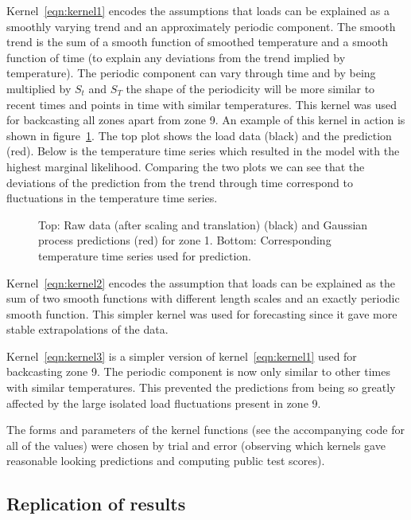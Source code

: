 \documentclass[preprint,authoryear,12pt]{elsarticle}
\begin{document}
Kernel~\eqref{eqn:kernel1} encodes the assumptions that loads can be explained as a smoothly varying trend and an approximately periodic component.
The smooth trend is the sum of a smooth function of smoothed temperature and a smooth function of time (to explain any deviations from the trend implied by temperature).
The periodic component can vary through time and by being multiplied by $S_t$ and $S_T$ the shape of the periodicity will be more similar to recent times and points in time with similar temperatures.
This kernel was used for backcasting all zones apart from zone 9.
An example of this kernel in action is shown in figure~\ref{fig:load_pred}.
The top plot shows the load data (black) and the prediction (red).
Below is the temperature time series which resulted in the model with the highest marginal likelihood.
Comparing the two plots we can see that the deviations of the prediction from the trend through time correspond to fluctuations in the temperature time series.

\begin{figure}[ht]
  \begin{center}
    
  \end{center}
  \caption{Top: Raw data (after scaling and translation) (black) and Gaussian process predictions (red) for zone 1. Bottom: Corresponding temperature time series used for prediction.}
  \label{fig:load_pred}
\end{figure}

Kernel~\eqref{eqn:kernel2} encodes the assumption that loads can be explained as the sum of two smooth functions with different length scales and an exactly periodic smooth function.
This simpler kernel was used for forecasting since it gave more stable extrapolations of the data.

Kernel~\eqref{eqn:kernel3} is a simpler version of kernel~\eqref{eqn:kernel1} used for backcasting zone 9.
The periodic component is now only similar to other times with similar temperatures.
This prevented the predictions from being so greatly affected by the large isolated load fluctuations present in zone 9.

The forms and parameters of the kernel functions (see the accompanying code for all of the values) were chosen by trial and error (observing which kernels gave reasonable looking predictions and computing public test scores).

\subsection{Replication of results}
\end{document}
